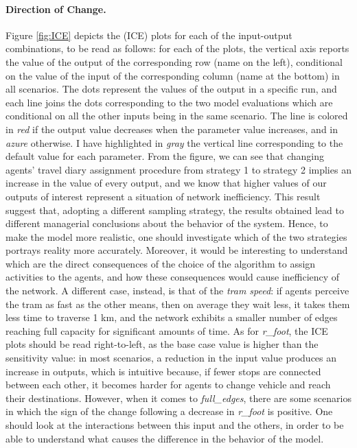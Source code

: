 \paragraph{Direction of Change.}
Figure \ref{fig:ICE} depicts the (ICE) plots for each of the input-output combinations, to be read as follows: for each of the plots, the vertical axis reports the value of the output of the corresponding row (name on the left), conditional on the value of the input of the corresponding column (name at the bottom) in all scenarios. The dots represent the values of the output in a specific run, and each line joins the dots corresponding to the two model evaluations which are conditional on all the other inputs being in the same scenario. The line is colored in \textit{red} if the output value decreases when the parameter value increases, and in \textit{azure} otherwise. I have highlighted in \textit{gray} the vertical line corresponding to the default value for each parameter. From the figure, we can see that changing agents' travel diary assignment procedure from strategy 1 to strategy 2 implies an increase in the value of every output, and we know that higher values of our outputs of interest represent a situation of network inefficiency. This result suggest that, adopting a different sampling strategy, the results obtained lead to different managerial conclusions about the behavior of the system. Hence, to make the model more realistic, one should investigate which of the two strategies portrays reality more accurately. 
Moreover, it would be interesting to understand which are the direct consequences of the choice of the algorithm to assign activities to the agents, and how these consequences would cause inefficiency of the network. 
A different case, instead, is that of the \textit{tram speed}: if agents perceive the tram as fast as the other means, then on average they wait less, it takes them less time to traverse 1 km, and the network exhibits a smaller number of edges reaching full capacity for significant amounts of time. As for \textit{r\_foot}, the ICE plots should be read right-to-left, as the base case value is higher than the sensitivity value: in most scenarios, a reduction in the input value produces an increase in outputs, which is intuitive because, if fewer stops are connected between each other, it becomes harder for agents to change vehicle and reach their destinations. However, when it comes to \textit{full\_edges}, there are some scenarios in which the sign of the change following a decrease in \textit{r\_foot} is positive. One should look at the interactions between this input and the others, in order to be able to understand what causes the difference in the behavior of the model.



